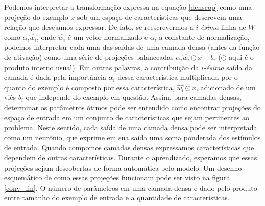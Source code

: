 Podemos interpretar a transformação expressa na equação \ref{denseop} como uma projeção do exemplo $x$ sob um espaço de características que descrevem uma relação que desejamos expressar. De fato, se reescrevermos a $i$-\textit{ésima} linha de $W$ como $\alpha_i \hat{w_i}$, onde $\hat{w_i}$ é um vetor normalizado e $\alpha_i$ a constante de normalização, podemos interpretar cada uma das saídas de uma camada densa (antes da função de ativação) como uma série de projeções balanceadas $\alpha_i \hat{w_i} \odot x + b_i$ ($\odot$ aqui é o produto interno usual). Em outras palavras, a contribuição da $i$-\textit{ésima} saída da camada é dada pela importância $\alpha_i$ dessa característica multiplicada por o quanto do exemplo é composto por essa característica,  $\hat{w_i} \odot x$, adicionado de um viés $b_i$ que independe do exemplo em questão. Assim, para camadas densas, determinar os parâmetros ótimos pode ser entendido como encontrar projeções do espaço de entrada em um conjunto de características que sejam pertinentes ao problema. Neste sentido, cada saída de uma camada densa pode ser interpretada como um neurônio, que exprime em sua saída uma soma ponderada dos estímulos de entrada. Quando compomos camadas densas expressamos características que dependem de outras características. Durante o aprendizado, esperamos que essas projeções sejam descobertas de forma automática pelo modelo. Um desenho esquemático de como essas projeções funcionam pode ser visto na figura \ref{conv_lin}. O número de parâmetros em uma camada densa é dado pelo produto entre tamanho do exemplo de entrada e a quantidade de características.

